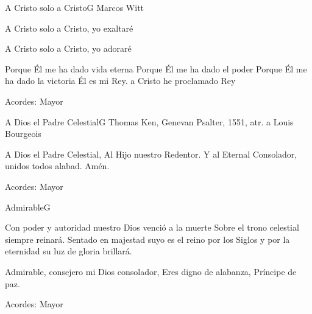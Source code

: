 \documentclass[12pt, spanish]{book}
\newcommand{\RevDate}{\today}
\newcommand{\NotCCLIed}{\relax}
\begin{document}
\begin{song}{A Cristo solo a Cristo}{G}
  {} %
  {Marcos Witt}
  {} %
  {} %


  \begin{SBVerse}
A Cristo solo a Cristo, yo exaltaré

A Cristo solo a Cristo, yo adoraré
  \end{SBVerse}
  \begin{SBVerse}
Porque Él me ha dado vida eterna
Porque Él me ha dado el poder
Porque Él me ha dado la victoria
Él es mi Rey.
a Cristo he proclamado Rey
  \end{SBVerse}
\ifChordBk
\begin{SBOpGroup}
    Acordes:
  Mayor
  \end{SBOpGroup}
\fi
\end{song}

\begin{song}{A Dios el Padre Celestial}{G}
  {} %
  {Thomas Ken, Genevan Psalter, 1551, atr. a Louis Bourgeois}
  {} %
  {} %


  \begin{SBVerse}
A Dios el Padre Celestial,
Al Hijo nuestro Redentor.
Y al Eternal Consolador,
unidos todos alabad.
Amén.
  \end{SBVerse}
\ifChordBk
\begin{SBOpGroup}
    Acordes:
  Mayor
  \end{SBOpGroup}
\fi
\end{song}


\begin{song}{Admirable}{G}
  {} %
  {}
  {} %
  {} %


  \begin{SBVerse}
Con poder y autoridad nuestro Dios venció a la
muerte
Sobre el trono celestial siempre reinará.
Sentado en majestad suyo es el reino por los
Siglos y por la eternidad su luz de gloria brillará.
  \end{SBVerse}

\begin{SBChorus}
Admirable, consejero mi Dios consolador,
Eres digno de alabanza, Príncipe de paz.
  \end{SBChorus}
\ifChordBk
\begin{SBOpGroup}
    Acordes:
  Mayor
  \end{SBOpGroup}
\fi
\end{song}
\end{document}
